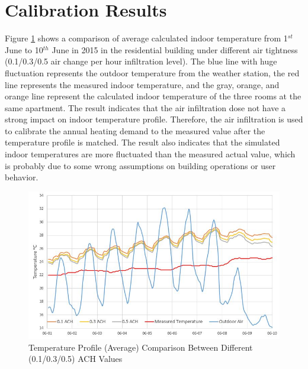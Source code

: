 \documentclass[a4paper, oneside]{discothesis}
\begin{document}
		



	\newpage
	\section{Calibration Results}

			Figure \ref{fig:ACH_Compare} shows a comparison of average calculated indoor temperature from 1$^{st}$ June to 10$^{th}$ June in 2015 in the residential building under different air tightness (0.1/0.3/0.5 air change per hour infiltration level). The blue line with huge fluctuation represents the outdoor temperature from the weather station, the red line represents the measured indoor temperature, and the gray, orange, and orange line represent the calculated indoor temperature of the three rooms at the same apartment. The result indicates that the air infiltration dose not have a strong impact on indoor temperature profile. Therefore, the air infiltration is used to calibrate the annual heating demand to the measured value after the temperature profile is matched. The result also indicates that the simulated indoor temperatures are more fluctuated than the measured actual value, which is probably due to some wrong assumptions on building operations or user behavior.\\
		
			\begin{figure}[H]
			\centering
			\includegraphics[scale=0.75]{ACH_Compare.JPG}
			\caption{Temperature Profile (Average) Comparison Between Different (0.1/0.3/0.5) ACH Values}
			\label{fig:ACH_Compare}
			\end{figure}
\end{document}
